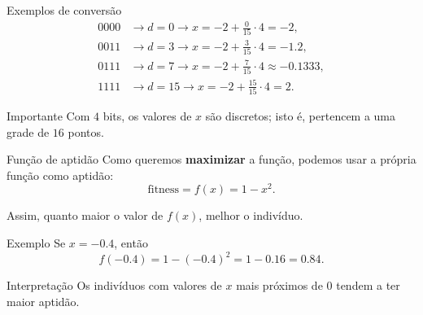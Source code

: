 \documentclass[mathserif, 10pt]{beamer}
\begin{document}
\begin{frame}{Exemplos de conversão}
	\begin{align*}
		0000 &\to d=0 \to x=-2+\frac{0}{15}\cdot 4=-2,\\[0.3cm]
		0011 &\to d=3 \to x=-2+\frac{3}{15}\cdot 4=-1.2,\\[0.3cm]
		0111 &\to d=7 \to x=-2+\frac{7}{15}\cdot 4\approx -0.1333,\\[0.3cm]
		1111 &\to d=15 \to x=-2+\frac{15}{15}\cdot 4=2.
	\end{align*}
	
	\pause
	
	\begin{block}{Importante}
		Com \(4\) bits, os valores de \(x\) são discretos; isto é, pertencem a uma grade de \(16\) pontos.
	\end{block}
\end{frame}

\begin{frame}{Função de aptidão}
	Como queremos \textbf{maximizar} a função, podemos usar a própria função como aptidão:
	\[
	\text{fitness}=f(x)=1-x^2.
	\]
	
	\pause
	
	Assim, quanto maior o valor de \(f(x)\), melhor o indivíduo.
	
	\pause
	
	\begin{exampleblock}{Exemplo}
		Se \(x=-0.4\), então
		\[
		f(-0.4)=1-(-0.4)^2=1-0.16=0.84.
		\]
	\end{exampleblock}
	
	\pause
	
	\begin{alertblock}{Interpretação}
		Os indivíduos com valores de \(x\) mais próximos de \(0\) tendem a ter maior aptidão.
	\end{alertblock}
\end{frame}
\end{document}
